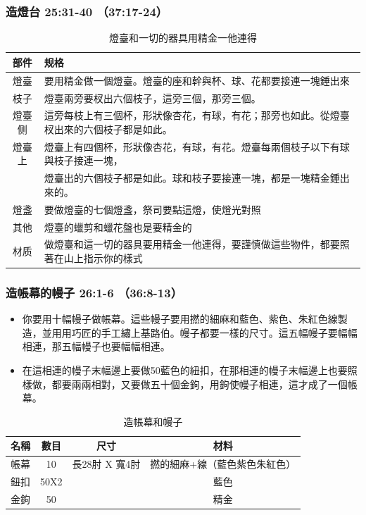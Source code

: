 \subsubsection{造燈台 25:31-40 （37:17-24）}
\begin{table}[H]
\centering
\begin{tabular}{|c|l| }
\hline
\hline
部件 & 规格  \\\hline
燈臺&要用精金做一個燈臺。燈臺的座和幹與杯、球、花都要接連一塊錘出來  \\\hline
枝子&燈臺兩旁要杈出六個枝子，這旁三個，那旁三個。  \\\hline
燈臺侧&這旁每枝上有三個杯，形狀像杏花，有球，有花；那旁也如此。從燈臺杈出來的六個枝子都是如此。 \\\hline
燈臺上&燈臺上有四個杯，形狀像杏花，有球，有花。燈臺每兩個枝子以下有球與枝子接連一塊，\\
          &燈臺出的六個枝子都是如此。球和枝子要接連一塊，都是一塊精金錘出來的。\\\hline
燈盞&要做燈臺的七個燈盞，祭司要點這燈，使燈光對照\\\hline
其他&燈臺的蠟剪和蠟花盤也是要精金的  \\\hline
材质&做燈臺和這一切的器具要用精金一他連得，要謹慎做這些物件，都要照著在山上指示你的樣式  \\\hline
\end{tabular}
\caption{燈臺和一切的器具用精金一他連得}
\end{table}


\subsubsection{造帳幕的幔子 26:1-6 （36:8-13）}
\begin{itemize} 
\itemsep-.35em
\item 你要用十幅幔子做帳幕。這些幔子要用撚的細麻和藍色、紫色、朱紅色線製造，並用用巧匠的手工繡上基路伯。幔子都要一樣的尺寸。這五幅幔子要幅幅相連，那五幅幔子也要幅幅相連。 
\item 在這相連的幔子末幅邊上要做50藍色的紐扣，在那相連的幔子末幅邊上也要照樣做，都要兩兩相對，又要做五十個金鉤，用鉤使幔子相連，這才成了一個帳幕。
\end{itemize}
\begin{table}[H]
\centering
\begin{tabular}{|c|c|c|c|}
\hline
\hline
 名稱   & 數目& 尺寸     & 材料  \\\hline
帳幕    &10  & 長28肘 X 寬4肘&撚的細麻+線（藍色紫色朱紅色） \\\hline
鈕扣&50X2&           &藍色 \\\hline
金鉤&50 &                  &  精金  \\\hline
\end{tabular}
\caption{造帳幕和幔子}
\end{table}



